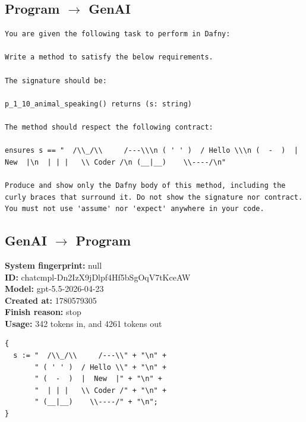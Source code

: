 \documentclass{article}
\begin{document}
\subsection*{Program $\rightarrow$ GenAI}
\begin{lstlisting}
You are given the following task to perform in Dafny:

Write a method to satisfy the below requirements.

The signature should be:

p_1_10_animal_speaking() returns (s: string)

The method should respect the following contract:

ensures s == "  /\\_/\\     /---\\\n ( ' ' )  / Hello \\\n (  -  )  |  New  |\n  | | |   \\ Coder /\n (__|__)    \\----/\n"

Produce and show only the Dafny body of this method, including the curly braces that surround it. Do not show the signature nor contract. You must not use 'assume' nor 'expect' anywhere in your code.
\end{lstlisting}
\subsection*{GenAI $\rightarrow$ Program}
\textbf{System fingerprint: }null
\\\textbf{ID: }chatcmpl-Dn2IzX9jDlpf4Hf5bSgOqV7tKceAW
\\\textbf{Model: }gpt-5.5-2026-04-23
\\\textbf{Created at: }1780579305
\\\textbf{Finish reason: }stop
\\\textbf{Usage: }342 tokens in, and 4261 tokens out
\begin{lstlisting}
{
  s := "  /\\_/\\     /---\\" + "\n" +
       " ( ' ' )  / Hello \\" + "\n" +
       " (  -  )  |  New  |" + "\n" +
       "  | | |   \\ Coder /" + "\n" +
       " (__|__)    \\----/" + "\n";
}
\end{lstlisting}
\end{document}
